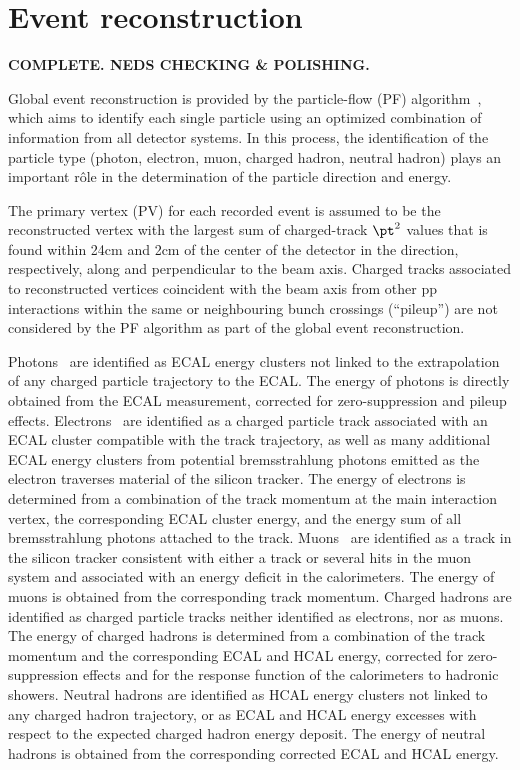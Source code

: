 \section{Event reconstruction}
\label{sec:event_reconstruction}

{\bf COMPLETE. NEDS CHECKING \& POLISHING.}

Global event reconstruction is provided by the particle-flow (PF)
algorithm~\cite{CMS-PAS-PFT-09-001,CMS-PAS-PFT-10-001}, which aims to
identify each single particle using an optimized combination of
information from all detector systems. In this process, the
identification of the particle type (photon, electron, muon, charged
hadron, neutral hadron) plays an important r\^ole in the determination
of the particle direction and energy.

The primary vertex (PV) for each recorded event is assumed to be the
reconstructed vertex with the largest sum of charged-track $\pt^2$
values that is found within 24\unit{cm} and 2\unit{cm} of the center
of the detector in the direction, respectively, along and
perpendicular to the beam axis. Charged tracks associated to
reconstructed vertices coincident with the beam axis from other pp
interactions within the same or neighbouring bunch crossings
(``pileup'') are not considered by the PF algorithm as part of the
global event reconstruction.

Photons~\cite{CMS:EGM-14-001} are identified as ECAL energy clusters
not linked to the extrapolation of any charged particle trajectory to
the ECAL. The energy of photons is directly obtained from the ECAL
measurement, corrected for zero-suppression and pileup effects.
Electrons~\cite{Khachatryan:2015hwa} are identified as a charged
particle track associated with an ECAL cluster compatible with the
track trajectory, as well as many additional ECAL energy clusters from
potential bremsstrahlung photons emitted as the electron traverses
material of the silicon tracker. The energy of electrons is determined
from a combination of the track momentum at the main interaction
vertex, the corresponding ECAL cluster energy, and the energy sum of
all bremsstrahlung photons attached to the track.
Muons~\cite{Chatrchyan:2012xi} are identified as a track in the
silicon tracker consistent with either a track or several hits in the
muon system and associated with an energy deficit in the calorimeters.
The energy of muons is obtained from the corresponding track momentum.
Charged hadrons are identified as charged particle tracks neither
identified as electrons, nor as muons. The energy of charged hadrons
is determined from a combination of the track momentum and the
corresponding ECAL and HCAL energy, corrected for zero-suppression
effects and for the response function of the calorimeters to hadronic
showers. Neutral hadrons are identified as HCAL energy clusters not
linked to any charged hadron trajectory, or as ECAL and HCAL energy
excesses with respect to the expected charged hadron energy deposit.
The energy of neutral hadrons is obtained from the corresponding
corrected ECAL and HCAL energy.

